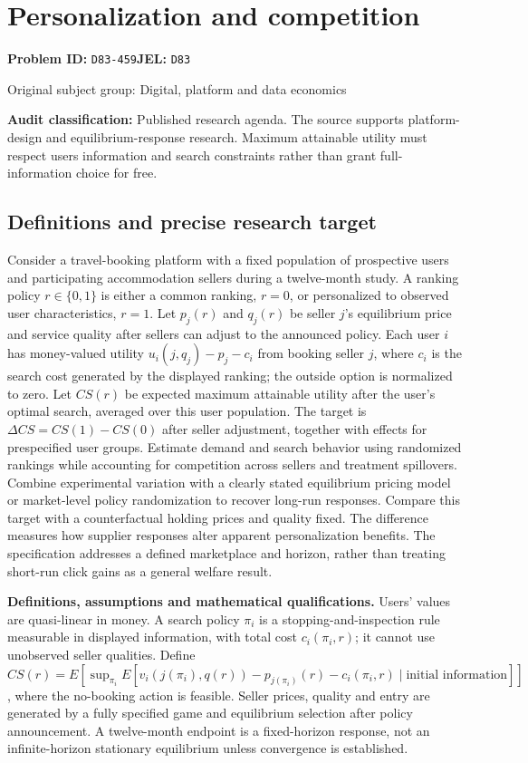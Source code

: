 \documentclass[11pt,a4paper]{article}
\begin{document}
\section*{Personalization and competition}
\textbf{Problem ID:} \texttt{D83-459}\quad \textbf{JEL:} \texttt{D83}\par
\label{problem:OP-0400}
{\sffamily\small\color{muted}Original subject group: Digital, platform and data economics\par}
\label{definitions:problem:30007682}
\textbf{Audit classification:} Published research agenda. The source supports platform-design and equilibrium-response research. Maximum attainable utility must respect users information and search constraints rather than grant full-information choice for free.
\subsection*{Definitions and precise research target}
Consider a travel-booking platform with a fixed population of prospective users and participating accommodation sellers during a twelve-month study. A ranking policy \(r\in\{0,1\}\) is either a common ranking, \(r=0\), or personalized to observed user characteristics, \(r=1\). Let \(p_j(r)\) and \(q_j(r)\) be seller \(j\)'s equilibrium price and service quality after sellers can adjust to the announced policy. Each user \(i\) has money-valued utility \(u_i(j,q_j)-p_j-c_i\) from booking seller \(j\), where \(c_i\) is the search cost generated by the displayed ranking; the outside option is normalized to zero. Let \(CS(r)\) be expected maximum attainable utility after the user's optimal search, averaged over this user population. The target is \(\Delta CS=CS(1)-CS(0)\) after seller adjustment, together with effects for prespecified user groups. Estimate demand and search behavior using randomized rankings while accounting for competition across sellers and treatment spillovers. Combine experimental variation with a clearly stated equilibrium pricing model or market-level policy randomization to recover long-run responses. Compare this target with a counterfactual holding prices and quality fixed. The difference measures how supplier responses alter apparent personalization benefits. The specification addresses a defined marketplace and horizon, rather than treating short-run click gains as a general welfare result.

\textbf{Definitions, assumptions and mathematical qualifications.} Users' values are quasi-linear in money. A search policy \(\pi_i\) is a stopping-and-inspection rule measurable in displayed information, with total cost \(c_i(\pi_i,r)\); it cannot use unobserved seller qualities. Define \(CS(r)=E[\sup_{\pi_i}E[v_i(j(\pi_i),q(r))-p_{j(\pi_i)}(r)-c_i(\pi_i,r)\mid\text{initial information}]]\), where the no-booking action is feasible. Seller prices, quality and entry are generated by a fully specified game and equilibrium selection after policy announcement. A twelve-month endpoint is a fixed-horizon response, not an infinite-horizon stationary equilibrium unless convergence is established.
\end{document}
